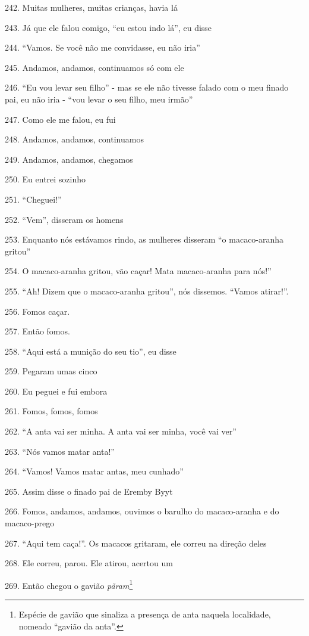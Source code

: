 242. Muitas mulheres, muitas crianças, havia lá

243. Já que ele falou comigo, ``eu estou indo lá'', eu disse

244. ``Vamos. Se você não me convidasse, eu não iria''

245. Andamos, andamos, continuamos só com ele

246. ``Eu vou levar seu filho'' - mas se ele não tivesse falado com o meu
finado pai, eu não iria - ``vou levar o seu filho, meu irmão''

247. Como ele me falou, eu fui

248. Andamos, andamos, continuamos

249. Andamos, andamos, chegamos

250. Eu entrei sozinho

251. ``Cheguei!''

252. ``Vem'', disseram os homens

253. Enquanto nós estávamos rindo, as mulheres disseram ``o macaco-aranha gritou''

254. O macaco-aranha gritou, vão caçar! Mata macaco-aranha para nós!''

255. ``Ah! Dizem que o macaco-aranha gritou'', nós dissemos. ``Vamos atirar!''.

256. Fomos caçar.

257. Então fomos.

258. ``Aqui está a munição do seu tio'', eu disse

259. Pegaram umas cinco

260. Eu peguei e fui embora

261. Fomos, fomos, fomos

262. ``A anta vai ser minha. A anta vai ser minha, você vai ver''

263. ``Nós vamos matar anta!''

264. ``Vamos! Vamos matar antas, meu cunhado''

265. Assim disse o finado pai de Eremby Byyt

266. Fomos, andamos, andamos, ouvimos o barulho do macaco-aranha e do
macaco-prego

267. ``Aqui tem caça!''. Os macacos gritaram, ele correu na direção deles

268. Ele correu, parou. Ele atirou, acertou um

269. Então chegou o gavião \emph{pãram}\footnote{Espécie de gavião que
  sinaliza a presença de anta naquela localidade, nomeado ``gavião da
  anta''.}

